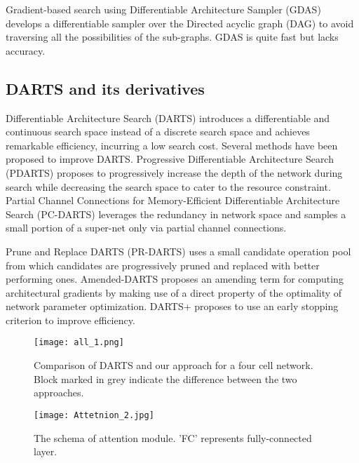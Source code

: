 \documentclass[10pt,a4paper,conference]{IEEEtran}
\begin{document}
 Gradient-based search using Differentiable Architecture Sampler (GDAS) \cite{dong2019searching:13} develops a differentiable sampler over the Directed acyclic graph (DAG) to avoid traversing all the possibilities of the sub-graphs. GDAS is quite fast but lacks accuracy.

\subsection{DARTS and its derivatives}
Differentiable Architecture Search (DARTS) \cite{liu2018darts:6} introduces a differentiable and continuous search space instead of a discrete search space and achieves remarkable efficiency, incurring a low search cost. Several methods have been proposed to improve DARTS. Progressive Differentiable Architecture Search (PDARTS) \cite{chen2019progressive:18} proposes to progressively increase the depth of the network during search while decreasing the search space to cater to the resource constraint. Partial Channel Connections for Memory-Efficient Differentiable Architecture Search (PC-DARTS) \cite{xu2019pc:17} leverages the redundancy in network space and samples a small portion of a super-net only via partial channel connections. 

Prune and Replace DARTS (PR-DARTS) \cite{laube2019prune:14} uses a small candidate operation pool from which candidates are progressively pruned and replaced with better performing ones. Amended-DARTS \cite{bi2019stabilizing:16} proposes an amending term for computing architectural gradients by making use of a direct property of the optimality of network parameter optimization. DARTS+ \cite{liang2019darts+:19} proposes to use an early stopping criterion to improve efficiency.
\nobreak
\begin{figure}[ht]
\vskip 0.2in
\begin{center}
\centerline{\texttt{[image: all\_1.png]}}
\caption{Comparison of DARTS \cite{liu2018darts:6} and our approach for a four cell network. Block
marked in grey indicate the difference between the two approaches.}
\label{1}
\end{center}
\vskip -0.2in
\end{figure}

\begin{figure}
\hskip 0.6in
\texttt{[image: Attetnion\_2.jpg]}
\caption{The schema of attention module. 'FC' represents fully-connected layer.}
\label{21}
\vskip -0.2in
\end{figure}
\end{document}

